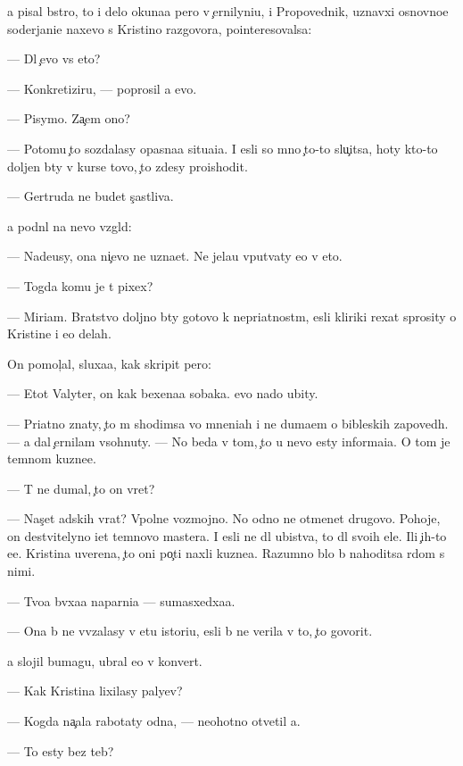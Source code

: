 \documentclass[10pt]{book}
\begin{document}
{\Y}a pisal b{\yi}stro, to i delo okuna{\y}a pero v {\c}ernilyni{\q}u, i Propovednik, uznavxi{\y} osnovno{\y}e soderjani{\y}e naxevo s Kristino{\y} razgovora, pointeresovalsa:

— Dl{\ia} {\c}evo vs{\e} eto?

— Konkretiziru{\y}, — poprosil {\y}a {\y}evo.

— Pisymo. Za{\c}em ono?

— Potomu {\c}to sozdalasy opasna{\y}a situa{\q}i{\y}a. I {\y}esli so mno{\y} {\c}to-to slu{\c}itsa, hoty kto-to doljen b{\yi}ty v kurse tovo, {\c}to zdesy proishodit.

— Gertruda ne budet s{\c}astliva.

{\Y}a podn{\ia}l na nevo vzgl{\ia}d:

— Nade{\y}usy, ona ni{\c}evo ne uzna{\y}et. Ne jela{\y}u vput{\yi}vaty {\y}e{\y}o v eto.

— Togda komu je t{\yi} pixex?

— Miriam. Bratstvo doljno b{\yi}ty gotovo k nepri{\y}atnost{\ia}m, {\y}esli kliriki rexat sprosity o Kristine i {\y}e{\y}o delah.

On pomol{\c}al, sluxa{\y}a, kak skripit pero:

— Etot Valyter, on kak bexena{\y}a sobaka. {\Y}evo nado ubity.

— Pri{\y}atno znaty, {\c}to m{\yi} shodimsa vo mneni{\y}ah i ne duma{\y}em o bible{\y}skih zapoved{\ia}h. — {\Y}a dal {\c}ernilam v{\yi}sohnuty. — No beda v tom, {\c}to u nevo {\y}esty informa{\q}i{\y}a. O tom je temnom kuzne{\q}e.

— T{\yi} ne dumal, {\c}to on vret?

— Nas{\c}et adskih vrat? Vpolne vozmojno. No odno ne otmen{\ia}{\y}et drugovo. Pohoje, on de{\y}stvitelyno i{\x}et temnovo mastera. I {\y}esli ne dl{\ia} ubi{\y}stva, to dl{\ia} svo{\y}ih {\q}ele{\y}. Ili {\c}{\yf}ih-to {\y}e{\x}e. Kristina uverena, {\c}to oni po{\c}ti naxli kuzne{\q}a. Razumno b{\yi}lo b{\yi} nahoditsa r{\ia}dom s nimi.

— Tvo{\y}a b{\yi}vxa{\y}a naparni{\q}a — sumasxedxa{\y}a.

— Ona b{\yi} ne vv{\ia}zalasy v etu istori{\y}u, {\y}esli b{\yi} ne verila v to, {\c}to govorit.

{\Y}a slojil bumagu, ubral {\y}e{\y}o v konvert.

— Kak Kristina lixilasy paly{\q}ev?

— Kogda na{\c}ala rabotaty odna, — neohotno otvetil {\y}a.

— To {\y}esty bez teb{\ia}?
\end{document}
